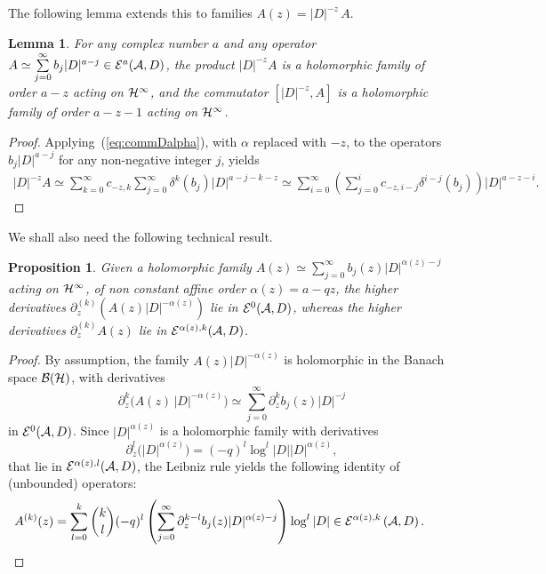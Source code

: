 \documentclass[11pt]{article}
\newtheorem{lemma}{Lemma}
\newtheorem{proposition}{Proposition}
\numberwithin{equation}{section}
\begin{document}
The following lemma extends this to  families $A(z)=  \vert D\vert^{-z}\, A$.
\begin{lemma} For any complex number $a$ and any operator $ A\simeq \sum\limits_{j=0}^\infty
b_j \vert D\vert^{a-j}\in {\cal E}^a({\cal A}, D)$,  the product
$\vert D\vert^{-z}  A$ is a holomorphic family of order $a-z$ acting on ${\cal H}^\infty$, and the commutator $\left[\vert D\vert^{-z}, A\right]$ is a holomorphic family  of order $a-z-1$ acting on ${\cal H}^\infty$.
\end{lemma}

\begin{proof} Applying~(\ref{eq:commDalpha}), with
$\alpha$ replaced with $-z$,  to the operators $b_j  \vert D\vert^{a-j}$ for any non-negative integer $j$,  yields
\begin{gather*}
 \vert D\vert^{-z}  A \simeq  \sum_{k=0}^\infty c_{-z,k}
  \sum_{j=0}^\infty \delta^k(b_j)   \vert D\vert^{a-j-k-z}
 \simeq  \sum_{i=0}^\infty
 \left( \sum_{j=0}^i  c_{-z,i-j} \delta^{i-j}(b_j)\right)   \vert D\vert^{a-z-i}.\tag*{\qed}
\end{gather*}\renewcommand{\qed}{}
\end{proof}

We shall also need the following technical result.

\begin{proposition}\label{prop:Aprime}  Given a  holomorphic family $A(z)\simeq\sum\limits_{j=0}^\infty
b_j(z) \vert D\vert^{\alpha(z)-j}$  acting on ${\cal H}^\infty$, of non
  constant affine  order
  $\alpha(z)=a-q  z$, the higher   derivatives
 $\partial_z^{(k)}\left(  A(z) \vert D\vert^{-\alpha(z)}\right)$  lie
 in ${\cal E}^{0}({\cal A}, D)$, whereas   the higher   derivatives
 $\partial_z^{(k)} A(z)$  lie
 in ${\cal E}^{\alpha(z), k}({\cal A}, D)$.
\end{proposition}

\begin{proof} By assumption, the family  $A(z)  \vert D\vert^{-\alpha(z)}$ is
holomorphic in the Banach space ${\cal B}({\cal H})$, with derivatives
\[
\partial_z^k\big(A(z)\, \vert D\vert^{-\alpha(z)}\big)\simeq
\sum_{j=0}^\infty \partial_z^k b_j(z)   \vert D\vert^{-j}
\]
in ${\cal E}^0({\cal A}, D)$. Since  $\vert D\vert^{\alpha(z)}$ is a holomorphic
   family with derivatives
   \[
   \partial_z^l\big(\vert D\vert^{\alpha(z)}\big)=
   (-q)^l \log^l \vert D\vert  \vert D\vert^{\alpha(z)},
   \] that lie
in ${\cal E}^{\alpha(z), l}({\cal A }, D)$, the Leibniz rule yields the
following identity of (unbounded) operators:
\begin{gather*}
A^{(k)}(z)= \sum_{l=0}^k {k\choose l} (-q)^l
\left(\sum_{j=0}^\infty \partial_z^{k-l}b_j(z)   \vert D\vert^{\alpha(z)-j}\right)
\log^l \vert D\vert\in {\cal E}^{\alpha(z),k}\left({\cal A}, D\right).\tag*{\qed}
\end{gather*}
\renewcommand{\qed}{}
 \end{proof}
\end{document}
